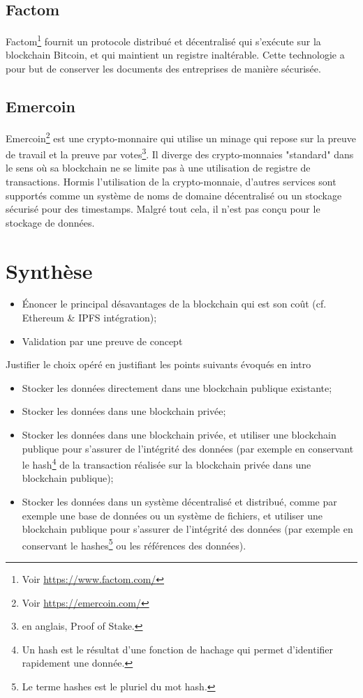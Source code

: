 \documentclass{tnreport}
\begin{document}
\subsection{Factom}

Factom\footnote{Voir \url{https://www.factom.com/}} fournit un protocole distribué et décentralisé qui s'exécute sur la blockchain Bitcoin, et qui maintient un registre inaltérable. Cette technologie a pour but de conserver les documents des entreprises de manière sécurisée.

\subsection{Emercoin}

Emercoin\footnote{Voir \url{https://emercoin.com/}} est une crypto-monnaire qui utilise un minage qui repose sur la preuve de travail et la preuve par votes\footnote{en anglais, Proof of Stake.}. Il diverge des crypto-monnaies "standard" dans le sens où sa blockchain ne se limite pas à une utilisation de registre de transactions. Hormis l'utilisation de la crypto-monnaie, d'autres services sont supportés comme un système de noms de domaine décentralisé ou un stockage sécurisé pour des timestamps. Malgré tout cela, il n'est pas conçu pour le stockage de données.

\section{Synthèse}

\begin{itemize}
	\item Énoncer le principal désavantages de la blockchain qui est son coût (cf. Ethereum \& IPFS intégration);
	\item Validation par une preuve de concept
\end{itemize}

Justifier le choix opéré en justifiant les points suivants évoqués en intro
\begin{itemize}
	\item Stocker les données directement dans une blockchain publique existante;
	\item Stocker les données dans une blockchain privée;
	\item Stocker les données dans une blockchain privée, et utiliser une blockchain publique pour s'assurer de l'intégrité des données (par exemple en conservant le hash\footnote{Un hash est le résultat d'une fonction de hachage qui permet d'identifier rapidement une donnée.} de la transaction réalisée sur la blockchain privée dans une blockchain publique);
	\item Stocker les données dans un système décentralisé et distribué, comme par exemple une base de données ou un système de fichiers, et utiliser une blockchain publique pour s'assurer de l'intégrité des données (par exemple en conservant le hashes\footnote{Le terme hashes est le pluriel du mot hash.} ou les références des données).
\end{itemize}
\end{document}
